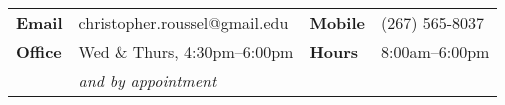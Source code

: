 \begin{center}
\begin{tabular}{| l l l l |}
	\hline
	\textbf{Email}	& christopher.roussel@gmail.edu		& \textbf{Mobile}	& (267) 565-8037 \\
	\textbf{Office}	& Wed \& Thurs, 4:30pm--6:00pm		& \textbf{Hours}	& 8:00am--6:00pm \\
					& \emph{and by appointment}			& 					& 				 \\
	\hline
\end{tabular}
\end{center}
